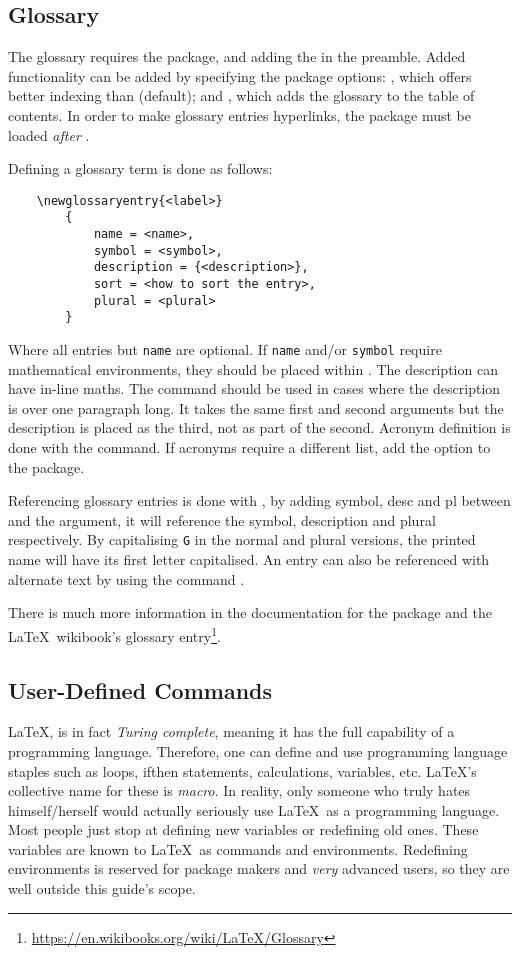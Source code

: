 \subsection{Glossary}
%
The glossary requires the  package, and adding the
 in the preamble.  Added functionality can be
added by specifying the package options: , which offers
better indexing than  (default); and , which
adds the glossary to the table of contents.  In order to make glossary
entries hyperlinks, the package must be loaded \emph{after}
.

Defining a glossary term is done as follows:
\begin{verbatim}
	\newglossaryentry{<label>}
	    {
	        name = <name>,
	        symbol = <symbol>,
	        description = {<description>},
	        sort = <how to sort the entry>,
	        plural = <plural>
	    }
\end{verbatim}
Where all entries but \verb|name| are optional.  If \verb|name| and/or
\verb|symbol| require mathematical environments, they should be placed
within .  The description can have in-line maths.
The  command
should be used in cases where the description is over one paragraph
long. It takes the same first and second arguments but the description
is placed as the third, not as part of the second.  Acronym definition
is done with the
 command.  If
acronyms require a different list, add the  option to
the  package.

Referencing glossary entries is done with , by
adding symbol, desc and pl between  and the argument, it
will reference the symbol, description and plural respectively.  By
capitalising \verb|G| in the normal and plural versions, the printed
name will have its first letter capitalised.  An entry can also be
referenced with alternate text by using the command
.

There is much more information in the documentation for the
 package and the \LaTeX~wikibook's glossary
entry\footnote{\url{https://en.wikibooks.org/wiki/LaTeX/Glossary}}.
%
\subsection{User-Defined Commands}
%
\LaTeX, is in fact \emph{Turing complete}, meaning it has the full
capability of a programming language.  Therefore, one can define and
use programming language staples such as loops, ifthen statements,
calculations, variables, etc. \LaTeX's collective name for these is
\emph{macro}.  In reality, only someone who truly hates
himself/herself would actually seriously use \LaTeX~as a programming
language.  Most people just stop at defining new variables or
redefining old ones.  These variables are known to \LaTeX~as commands
and environments.  Redefining environments is reserved for package
makers and \emph{very} advanced users, so they are well outside this
guide's scope.


